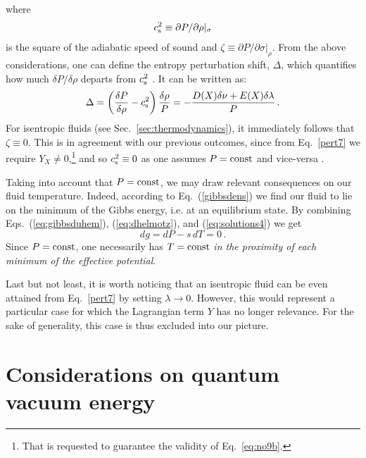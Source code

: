 \documentclass[twocolumn,showpacs, nofootinbib,aps,superscriptaddress, eqsecnum,prd,prl,notitlepage,showkeys,10pt,reprint]{revtex4-1}
\begin{document}
%
where
\begin{eqnarray}
c_{\rm s}^2\equiv\partial P/\partial\rho|_\sigma
\end{eqnarray}
%
is the square of the adiabatic speed of sound and $\zeta\equiv\partial P/\partial\sigma|_\rho$.
From the above considerations, one can define the entropy perturbation shift, $\Delta$, which quantifies how much $\delta P/\delta \rho$ departs from $c_{\rm s}^2$ \cite{2014CQGra..31e5006P}. It can be written as:
%
\begin{equation}
\label{pert9}
\Delta=\left(\frac{\delta P}{\delta \rho}-c_{\rm s}^2\right)\frac{\delta\rho}{P}=-\frac{D(X)\delta\nu+E(X)\delta\lambda}{P}\,.
\end{equation}
%
For isentropic fluids (see Sec.~\ref{sec:thermodynamics}), it immediately follows that $\zeta\equiv0$. This is in agreement with our previous outcomes, since from Eq.~\eqref{pert7} we require $Y_X\neq0$,\footnote{That is requested to guarantee the validity of Eq.~\eqref{eq:no9b}.} and so $c_{\rm s}^2\equiv0$ as one assumes $P={\rm const}$ and vice-versa \cite{2009PhRvD..80l3001K,2010PhRvD..82j3535S,2012Ap&SS.338..345L,2014IJMPD..2350012L}.

Taking into account that $P={\rm const}$, we may draw relevant consequences on our fluid temperature.
Indeed, according to Eq.~(\ref{gibbsdens}) we find our fluid to lie on the minimum of the Gibbs energy, i.e. at an equilibrium state.
By combining Eqs.~(\ref{eq:gibbsduhem}), (\ref{eq:dhelmotz}), and (\ref{eq:solutions4}) we get
%
\begin{equation}
\label{equilibrium}
dg = dP - s\,dT = 0\,.
\end{equation}
%
Since $P={\rm const}$, one necessarily has $T={\rm const}$ \emph{in the proximity of each minimum of the effective potential}.

Last but not least, it is worth noticing that an isentropic fluid can be even attained from Eq.~\eqref{pert7} by setting $\lambda\rightarrow0$. However, this would represent a particular case for which the Lagrangian term $Y$ has no longer relevance. For the sake of generality, this case is thus excluded into our picture.

\section{Considerations on quantum vacuum energy}
\label{vacuumenergy}
\end{document}
